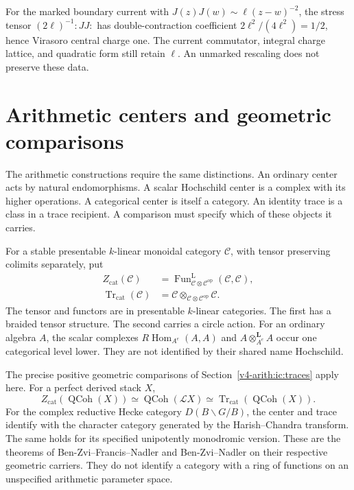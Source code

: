 For the marked boundary current with
$J(z)J(w)\sim\ell(z-w)^{-2}$, the stress tensor
$(2\ell)^{-1}:JJ:$ has double-contraction coefficient
$2\ell^2/(4\ell^2)=1/2$, hence Virasoro central charge one.
The current commutator, integral charge lattice, and
quadratic form still retain $\ell$.
An unmarked rescaling does not preserve these data.

\section{Arithmetic centers and geometric comparisons}
\label{v4-arith:centers:sec:arithmetic}

The arithmetic constructions require the same distinctions.
An ordinary center acts by natural endomorphisms.
A scalar Hochschild center is a complex with its higher
operations. A categorical center is itself a category.
An identity trace is a class in a trace recipient.
A comparison must specify which of these objects it carries.

For a stable presentable $k$-linear monoidal category
$\mathcal C$, with tensor preserving colimits separately, put
\[
 \begin{split}
 Z_{\mathrm{cat}}(\mathcal C)
 &=\operatorname{Fun}^{\mathrm L}_{
       \mathcal C\otimes\mathcal C^{\mathrm{op}}}
       (\mathcal C,\mathcal C),\\
 \operatorname{Tr}_{\mathrm{cat}}(\mathcal C)
 &=\mathcal C\otimes_{
       \mathcal C\otimes\mathcal C^{\mathrm{op}}}\mathcal C.
 \end{split}
\]
The tensor and functors are in presentable $k$-linear
categories. The first has a braided tensor structure.
The second carries a circle action.
For an ordinary algebra $A$, the scalar complexes
$R\operatorname{Hom}_{A^e}(A,A)$ and
$A\otimes_{A^e}^{\mathbf L}A$ occur one categorical level
lower. They are not identified by their shared name
Hochschild.

The precise positive geometric comparisons of
Section~\ref{v4-arith:ic:traces} apply here.
For a perfect derived stack $X$,
\[
 Z_{\mathrm{cat}}(\operatorname{QCoh}(X))
 \simeq\operatorname{QCoh}(\mathcal LX)
 \simeq\operatorname{Tr}_{\mathrm{cat}}
             (\operatorname{QCoh}(X)).
\]
For the complex reductive Hecke category
$D(B\backslash G/B)$, the center and trace identify with the
character category generated by the Harish--Chandra transform.
The same holds for its specified unipotently monodromic version.
These are the theorems of Ben-Zvi--Francis--Nadler and
Ben-Zvi--Nadler on their respective geometric carriers.
They do not identify a category with a ring of functions
on an unspecified arithmetic parameter space.

